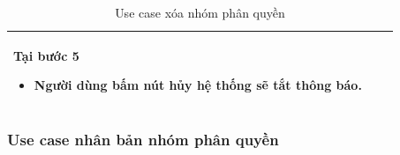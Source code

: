 \documentclass[12pt,a4paper]{article}
\begin{document}
\begin{table}[H]
\begin{tabular}{|p{3.5cm}|p{11.5cm}|c|}
            Tại bước 5\newline
            \vspace{-.8cm}\begin{itemize}
                              \item Người dùng bấm nút hủy hệ thống sẽ tắt thông báo.
            \end{itemize} \\
            \hline
        \end{tabular}
        \caption{Use case xóa nhóm phân quyền }
    \end{table}


    \subsubsection*{Use case nhân bản nhóm phân quyền }
\end{document}
